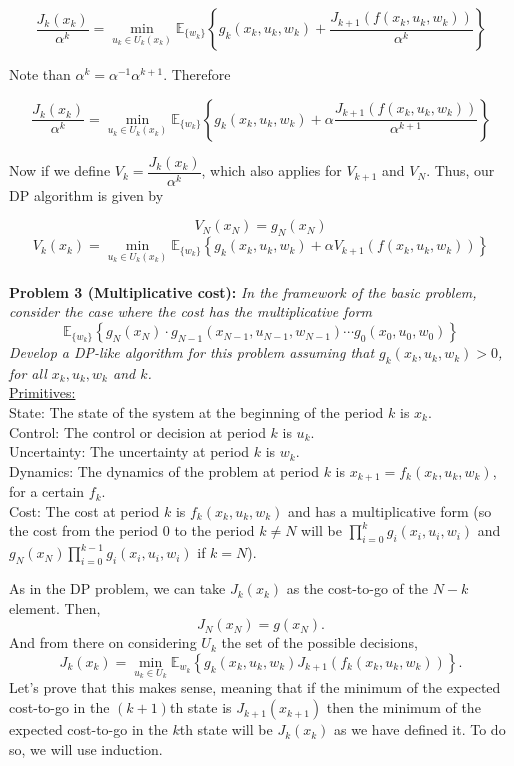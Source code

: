 \documentclass[11pt, english]{article}
\begin{document}
$$ \dfrac{J_k(x_k)}{\alpha^k} = \min_{u_k \in U_k(x_k)}\mathbb{E}_{\{w_k\}}\left\{g_k\left(x_k,u_k,w_k\right) + \dfrac{J_{k + 1} \left(f\left(x_k,u_k,w_k\right)\right)}{\alpha^k}  \right\}$$

Note than $\alpha^k = \alpha^{-1} \alpha^{k+1}$. Therefore

$$ \dfrac{J_k(x_k)}{\alpha^k} = \min_{u_k \in U_k(x_k)}\mathbb{E}_{\{w_k\}}\left\{g_k\left(x_k,u_k,w_k\right) + \alpha \dfrac{J_{k + 1} \left(f\left(x_k,u_k,w_k\right)\right)}{\alpha^{k+1}}  \right\}$$

Now if we define $V_k = \dfrac{J_k(x_k)}{\alpha^k}$, which also applies for $V_{k+1}$ and $V_N$. Thus, our DP algorithm is given by

$$V_N (x_N) = g_N (x_N)$$
$$V_k(x_k) = \min_{u_k \in U_k(x_k)}\mathbb{E}_{\{w_k\}}\left\{g_k\left(x_k,u_k,w_k\right) + \alpha V_{k + 1} \left(f\left(x_k,u_k,w_k\right)\right) \right\}$$\\


\textbf{Problem 3 (Multiplicative cost):}\textit{ In the framework of the basic problem, consider the case where the cost has the multiplicative form}
$$\mathbb{E}_{\{w_k\}}\left\{g_N(x_N)\cdot g_{N-1}(x_{N-1},u_{N-1},w_{N-1})\cdots g_0(x_0,u_0,w_0) \right\}$$
\textit{Develop a DP-like algorithm for this problem assuming that $g_k(x_k,u_k,w_k)>0$, for all $x_k,u_k,w_k$ and $k$.}\\
\underline{Primitives:}\\
State: The state of the system at the beginning of the period $k$ is $x_k$.\\
Control: The control or decision at period $k$ is $u_k$.\\
Uncertainty: The uncertainty at period $k$ is $w_k$.\\
Dynamics: The dynamics of the problem at period $k$ is $x_{k+1}=f_k(x_k,u_k,w_k)$, for a certain $f_k$.\\
Cost: The cost at period $k$ is $f_k(x_k,u_k,w_k)$ and has a multiplicative form (so the cost from the period 0 to the period $k\neq N$ will be $\prod\limits_{i=0}^k g_i(x_i,u_i,w_i)$ and $g_N(x_N)\prod\limits_{i=0}^{k-1} g_i(x_i,u_i,w_i)$ if $k=N$).
 
As in the DP problem, we can take $J_k(x_k)$ as the cost-to-go of the $N-k$ element. Then, 
$$J_N(x_N)=g(x_N).$$
And from there on considering $U_k$ the set of the possible decisions,
$$J_{k}(x_k)=\underset{u_k\in U_k}{\min}\mathbb{E}_{w_k}\left\{g_k(x_k,u_k,w_k)J_{k+1}(f_k(x_k,u_k,w_k))\right\}.$$
Let's prove that this makes sense, meaning that if the minimum of the expected cost-to-go in the $(k+1)$th state is $J_{k+1}(x_{k+1})$ then the minimum of the expected cost-to-go in the $k$th state will be $J_k(x_k)$ as we have defined it. To do so, we will use induction. \\
\end{document}
